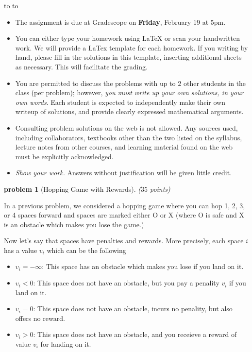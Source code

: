 \documentclass[10pt]{article}
\newcommand{\handout}{
   \renewcommand{\thepage}{H\hnumber-\arabic{page}}
   \noindent
   \begin{center}
      \vbox{
    \hbox to \columnwidth {\sc{\course} --- \prof \hfill}
    \vspace{-2mm}
    \hbox to \columnwidth {\sc due \MakeLowercase{\duedate} \duelocation\hfill {\Huge\color{mdb}H\hnumber.\yourname}}
      }
   \end{center}
   \vspace*{2mm}
}
\newtheorem{problem}{\sc\color{cit}problem}
\begin{document}
\handout
\begin{itemize}
\item The assignment is due at Gradescope on {\bf Friday}, February 19 at 5pm.

\item You can either type your homework using LaTeX or scan your handwritten work. We will provide a LaTex template for each homework. If you writing by hand, please fill in the solutions in this template, inserting additional sheets as necessary. This will facilitate the grading.

\item You are permitted to discuss the problems with up to 2 other students in the class (per problem); however, {\em you must write up your own solutions, in your own words}. Each student is expected to independently make their own writeup of solutions, and provide clearly expressed mathematical arguments.

\item Consulting problem solutions on the web is not allowed.  Any sources used, including collaborators, textbooks other than the two listed on the syllabus, lecture notes from other courses, and learning material found on the web must be explicitly acknowledged.

\item {\em Show your work.} Answers without justification will be given little credit.
\end{itemize}

\newpage
\begin{problem}[Hopping Game with Rewards] ($35$ points)
\end{problem}
In a previous problem, we considered a hopping game where you can hop 1, 2, 3, or 4 spaces forward and spaces are marked either O or X (where O is safe and X is an obstacle which makes you lose the game.)

Now let's say that spaces have penalties and rewards. More precisely, each space $i$ has a value $v_i$ which can be the following
\begin{itemize}
\item $v_i = -\infty$: This space has an obstacle which makes you lose if you land on it.
\item $v_i < 0$: This space does not have an obstacle, but you pay a penality $v_i$ if you land on it.
\item $v_i = 0$: This space does not have an obstacle, incurs no penality, but also offers no reward.
\item $v_i > 0$: This space does not have an obstacle, and you receieve a reward of value $v_i$ for landing on it.
\end{itemize}
\end{document}
